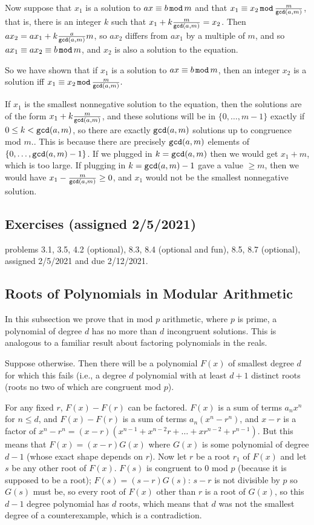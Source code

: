 \documentclass[12pt]{article}
\begin{document}
Now suppose that $x_1$ is a solution to $ax \equiv b\,{\tt mod}\,m$ and that $x_1\equiv x_2\, {\tt mod}\, \frac m{{\tt gcd}(a,m)}$, that is, there is an integer $k$ such that $x_1+k\frac m{{\tt gcd}(a,m)} = x_2$.  Then $ax_2 = ax_1+k\frac a{{\tt gcd}(a,m)}m$, so $ax_2$ differs from $ax_1$ by a multiple of $m$, and so $ax_1 \equiv ax_2 \equiv b \, {\tt mod}\, m$, and $x_2$ is also a solution to the equation.

So we have shown that if $x_1$ is a solution to $ax \equiv b\,{\tt mod}\,m$, then an integer $x_2$ is a solution iff $x_1\equiv x_2\, {\tt mod}\, \frac m{{\tt gcd}(a,m)}.$

If $x_1$ is the smallest nonnegative solution to the equation, then the solutions are of the form $x_1+k\frac m{{\tt gcd}(a,m)}$, and these solutions will be in $\{0,\ldots,m-1\}$ exactly if $0 \leq k < {\tt gcd}(a,m)$, so there are exactly ${\tt gcd}(a,m)$ solutions up to congruence mod $m$..  This is because there are precisely ${\tt gcd}(a,m)$ elements of $\{0,\ldots,{\tt gcd}(a,m)-1\}$.  If we plugged in $k={\tt gcd}(a,m)$ then we would get $x_1+m$, which is too large.  If plugging in $k={\tt gcd}(a,m)-1$ gave a value $\geq m$, then we would have $x_1-\frac m{{\tt gcd}(a,m)}\geq 0$, and $x_1$ would not be the smallest nonnegative solution.

\subsection{Exercises (assigned 2/5/2021)}

problems 3.1, 3.5, 4.2 (optional), 8.3, 8.4 (optional and fun), 8.5, 8.7 (optional), assigned 2/5/2021 and due 2/12/2021.


\subsection{Roots of Polynomials in Modular Arithmetic}

In this subsection we prove that in mod $p$ arithmetic, where $p$ is prime, a polynomial of degree $d$ has
no more than $d$ incongruent solutions.   This is analogous to a familiar result about factoring polynomials in the reals.

Suppose otherwise.  Then there will be a polynomial $F(x)$ of smallest degree $d$ for which this fails (i.e., a degree $d$ polynomial with at least $d+1$ distinct roots (roots no two of which are congruent mod $p$).

For any fixed $r$, $F(x)-F(r)$ can be factored.  $F(x)$ is a sum of terms $a_nx^n$ for $n \leq d$,
and $F(x)-F(r)$ is a sum of terms $a_n(x^n-r^n)$, and $x-r$ is a factor of $x^n-r^n = (x-r)(x^{n-1}+x^{n-2}r+\ldots+xr^{n-2}+ r^{n-1})$.  But this means that $F(x)=(x-r)G(x)$ where $G(x)$
is some polynomial of degree $d-1$ (whose exact shape depends on $r$).  Now let $r$ be a root $r_1$ of $F(x)$ and let $s$ be any other root of $F(x)$.  $F(s)$ is congruent to 0 mod $p$ (because it is supposed to be a root);
$F(s) = (s-r)G(s)$:  $s-r$ is not divisible by $p$ so $G(s)$ must be, so every root of $F(x)$ other than $r$
is a root of $G(x)$, so this $d-1$ degree polynomial has $d$ roots, which means that $d$ was not the smallest degree of a counterexample, which is a contradiction.
\end{document}
